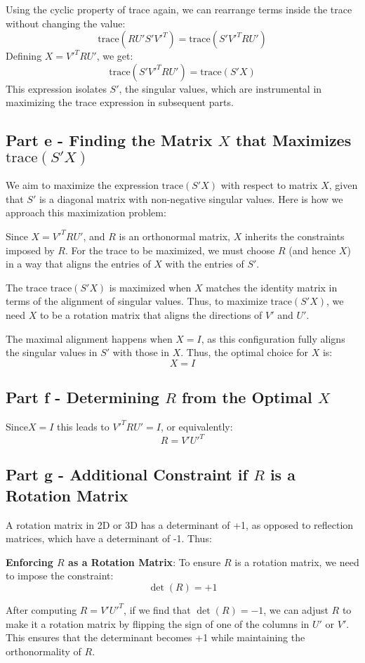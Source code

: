 \documentclass{article}
\begin{document}
Using the cyclic property of trace again, we can rearrange terms inside the trace without changing the value:
\[
\text{trace}(R U' S' V'^T) = \text{trace}(S' V'^T R U')
\]
Defining \( X = V'^T R U' \), we get:
\[
\text{trace}(S' V'^T R U') = \text{trace}(S' X)
\]
This expression isolates \( S' \), the singular values, which are instrumental in maximizing the trace expression in subsequent parts.


\subsection*{Part e - Finding the Matrix \( X \) that Maximizes \( \text{trace}(S' X) \)}

We aim to maximize the expression \( \text{trace}(S' X) \) with respect to matrix \( X \), given that \( S' \) is a diagonal matrix with non-negative singular values. Here is how we approach this maximization problem:


Since \( X = V'^T R U' \), and \( R \) is an orthonormal matrix, \( X \) inherits the constraints imposed by \( R \). For the trace to be maximized, we must choose \( R \) (and hence \( X \)) in a way that aligns the entries of \( X \) with the entries of \( S' \).


The trace \( \text{trace}(S' X) \) is maximized when \( X \) matches the identity matrix in terms of the alignment of singular values. Thus, to maximize \( \text{trace}(S' X) \), we need \( X \) to be a rotation matrix that aligns the directions of \( V' \) and \( U' \).


The maximal alignment happens when \( X = I \), as this configuration fully aligns the singular values in \( S' \) with those in \( X \). Thus, the optimal choice for \( X \) is:
\[
X = I
\]


\subsection*{Part f - Determining \( R \) from the Optimal \( X \)}

Since\( X = I \)  this leads to \( V'^T R U' = I \), or equivalently:
   \[
   R = V' U'^T
   \]


\subsection*{Part g - Additional Constraint if \( R \) is a Rotation Matrix}

 A rotation matrix in 2D or 3D has a determinant of +1, as opposed to reflection matrices, which have a determinant of -1. Thus:

\textbf{Enforcing \( R \) as a Rotation Matrix}:
   To ensure \( R \) is a rotation matrix, we need to impose the constraint:
   \[
   \det(R) = +1
   \]


   After computing \( R = V' U'^T \), if we find that \( \det(R) = -1 \), we can adjust \( R \) to make it a rotation matrix by flipping the sign of one of the columns in \( U' \) or \( V' \). This ensures that the determinant becomes +1 while maintaining the orthonormality of \( R \).
\end{document}
